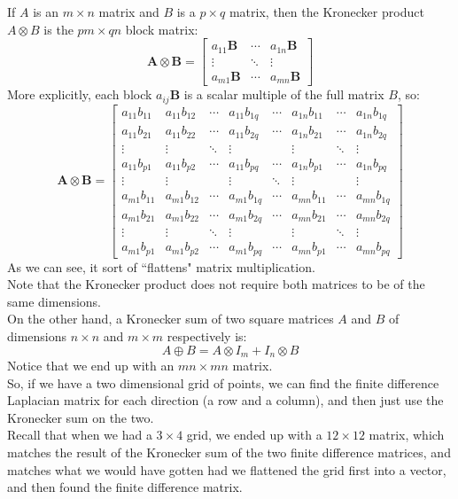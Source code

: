 \documentclass[12pt]{article}
\begin{document}
If $ A $ is an $m \times n$ matrix and $B$ 
is a $ p \times q$ matrix, 
then the Kronecker product $A \otimes B$ 
is the $ pm \times qn$ block matrix:
\[ \mathbf{A} \otimes \mathbf{B} = 
\begin{bmatrix}
a_{11} \mathbf{B} & \cdots & a_{1n} \mathbf{B} \\
\vdots & \ddots & \vdots \\
a_{m1} \mathbf{B} & \cdots & a_{mn} \mathbf{B}
\end{bmatrix} \]
More explicitly, each block $ a_{ij} \mathbf{B} $ 
is a scalar multiple of the full matrix $B$, so:
\[\mathbf{A} \otimes \mathbf{B} =
\begin{bmatrix}
a_{11} b_{11} & a_{11} b_{12} & \cdots & a_{11} b_{1q} & \cdots & a_{1n} b_{11} & \cdots & a_{1n} b_{1q} \\
a_{11} b_{21} & a_{11} b_{22} & \cdots & a_{11} b_{2q} & \cdots & a_{1n} b_{21} & \cdots & a_{1n} b_{2q} \\
\vdots & \vdots & \ddots & \vdots & & \vdots & \ddots & \vdots \\
a_{11} b_{p1} & a_{11} b_{p2} & \cdots & a_{11} b_{pq} & \cdots & a_{1n} b_{p1} & \cdots & a_{1n} b_{pq} \\
\vdots & \vdots & & \vdots & \ddots & \vdots & & \vdots \\
a_{m1} b_{11} & a_{m1} b_{12} & \cdots & a_{m1} b_{1q} & \cdots & a_{mn} b_{11} & \cdots & a_{mn} b_{1q} \\
a_{m1} b_{21} & a_{m1} b_{22} & \cdots & a_{m1} b_{2q} & \cdots & a_{mn} b_{21} & \cdots & a_{mn} b_{2q} \\
\vdots & \vdots & \ddots & \vdots & & \vdots & \ddots & \vdots \\
a_{m1} b_{p1} & a_{m1} b_{p2} & \cdots & a_{m1} b_{pq} & \cdots & a_{mn} b_{p1} & \cdots & a_{mn} b_{pq}
\end{bmatrix} \]
As we can see, it sort of ``flattens"
matrix multiplication. \\
Note that the Kronecker product
does not require both matrices
to be of the same dimensions. \\

On the other hand, a Kronecker
sum of two square matrices $A$
and $B$ of dimensions $n \times n$
and $m \times m$ respectively
is:
\[ A \oplus B = A \otimes I_m + I_n \otimes B \]
Notice that we end up with an $mn \times mn$
matrix. \\

So, if we have a two dimensional grid of points,
we can find the finite difference Laplacian
matrix for each direction (a row
and a column), and then just
use the Kronecker sum on the two. \\
Recall that when we had a $3 \times 4$ grid,
we ended up with a $12 \times 12$ matrix, 
which matches the result of the Kronecker
sum of the two finite difference matrices,
and matches what we would have gotten
had we flattened the grid first into
a vector, and then found the finite
difference matrix. \\
\end{document}
